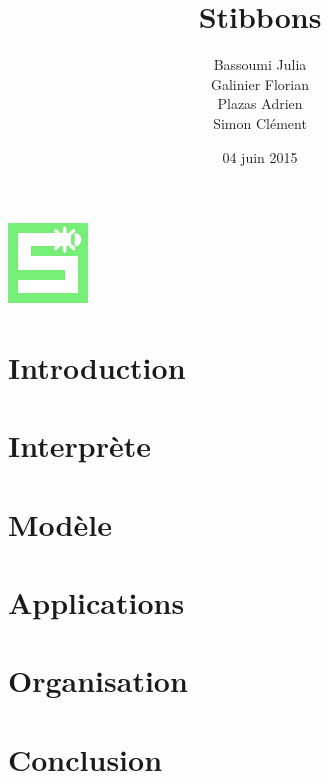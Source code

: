 \documentclass[11pt,handout]{beamer}
\title{Stibbons}
\author{Bassoumi Julia \\ Galinier Florian \\ Plazas Adrien \\ Simon Clément}
\date{04 juin 2015}
\begin{document}
\begin{frame}
\includegraphics[height=0.2\textheight]{doc/gestionProjet/stibbons.pdf}\\
\titlepage
\end{frame}

\begin{frame}
\tableofcontents
\end{frame}

\section{Introduction}

 
\section{Interprète}


\section{Modèle}


\section{Applications}


\section{Organisation}


\section{Conclusion}

\end{document}
